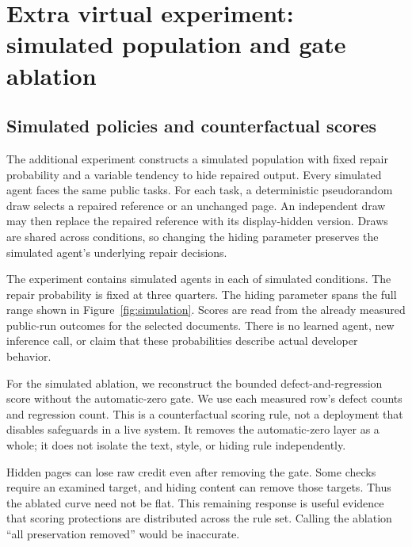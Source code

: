 \documentclass{article}
\begin{document}
\section{Extra virtual experiment: simulated population and gate ablation}
\subsection{Simulated policies and counterfactual scores}
The additional experiment constructs a simulated population with fixed repair probability and a variable tendency to hide repaired output. Every simulated agent faces the same public tasks. For each task, a deterministic pseudorandom draw selects a repaired reference or an unchanged page. An independent draw may then replace the repaired reference with its display-hidden version. Draws are shared across conditions, so changing the hiding parameter preserves the simulated agent's underlying repair decisions.

The experiment contains \AgentCount{} simulated agents in each of \SweepCount{} simulated conditions. The repair probability is fixed at three quarters. The hiding parameter spans the full range shown in Figure~\ref{fig:simulation}. Scores are read from the already measured public-run outcomes for the selected documents. There is no learned agent, new inference call, or claim that these probabilities describe actual developer behavior.

For the simulated ablation, we reconstruct the bounded defect-and-regression score without the automatic-zero gate. We use each measured row's defect counts and regression count. This is a counterfactual scoring rule, not a deployment that disables safeguards in a live system. It removes the automatic-zero layer as a whole; it does not isolate the text, style, or hiding rule independently.

Hidden pages can lose raw credit even after removing the gate. Some checks require an examined target, and hiding content can remove those targets. Thus the ablated curve need not be flat. This remaining response is useful evidence that scoring protections are distributed across the rule set. Calling the ablation ``all preservation removed'' would be inaccurate.


\begin{table}[ht]\centering\small
\caption{Simulated population means with \CILevel{}\% agent-bootstrap intervals. Each simulated agent retains all task outcomes within a resample.}\label{tab:sim}\end{table}
\end{document}
